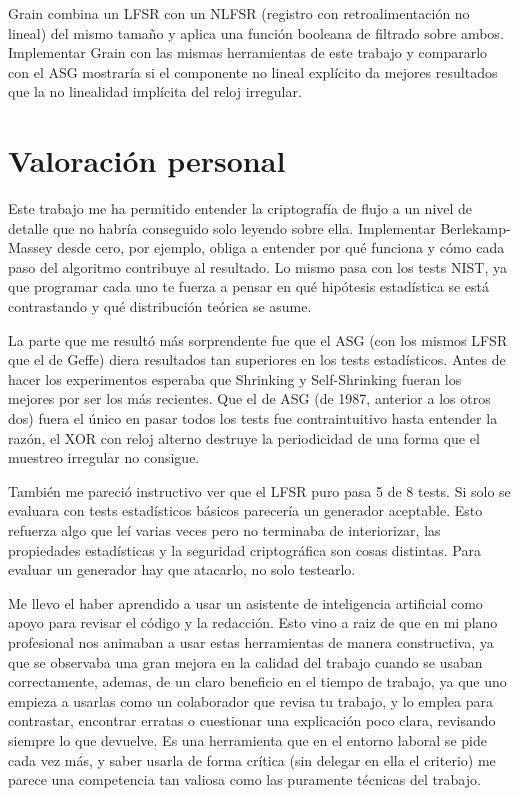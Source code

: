 Grain combina un LFSR con un NLFSR (registro con retroalimentación no lineal) del mismo tamaño y aplica una función booleana de filtrado sobre ambos.
Implementar Grain con las mismas herramientas de este trabajo y compararlo con el ASG mostraría si el componente no lineal explícito da mejores resultados
que la no linealidad implícita del reloj irregular.

\section{Valoración personal}

Este trabajo me ha permitido entender la criptografía de flujo a un nivel de detalle que no habría conseguido solo leyendo sobre ella.
Implementar Berlekamp-Massey desde cero, por ejemplo, obliga a entender por qué funciona y cómo cada paso del algoritmo contribuye al resultado.
Lo mismo pasa con los tests NIST, ya que programar cada uno te fuerza a pensar en qué hipótesis estadística se está contrastando
y qué distribución teórica se asume.

La parte que me resultó más sorprendente fue que el ASG (con los mismos LFSR que el de Geffe) diera resultados tan superiores en los tests estadísticos.
Antes de hacer los experimentos esperaba que Shrinking y Self-Shrinking fueran los mejores por ser los más recientes.
Que el de ASG (de 1987, anterior a los otros dos) fuera el único en pasar todos los tests fue contraintuitivo hasta entender la razón,
el XOR con reloj alterno destruye la periodicidad de una forma que el muestreo irregular no consigue.

También me pareció instructivo ver que el LFSR puro pasa 5 de 8 tests. Si solo se evaluara con tests estadísticos básicos parecería un generador aceptable.
Esto refuerza algo que leí varias veces pero no terminaba de interiorizar, las propiedades estadísticas y la seguridad criptográfica son cosas distintas.
Para evaluar un generador hay que atacarlo, no solo testearlo.

Me llevo el haber aprendido a usar un asistente de inteligencia artificial como apoyo para revisar el código y la redacción.
Esto vino a raiz de que en mi plano profesional nos animaban a usar estas herramientas de manera constructiva, ya que se observaba una gran mejora en la calidad del trabajo cuando se usaban correctamente,
ademas, de un claro beneficio en el tiempo de trabajo, ya que uno empieza a usarlas como un colaborador que revisa tu trabajo, y lo emplea para contrastar, encontrar erratas o cuestionar una explicación poco clara, revisando siempre lo que devuelve.
Es una herramienta que en el entorno laboral se pide cada vez más, y saber usarla de forma crítica (sin delegar en ella el criterio) me parece una competencia tan valiosa como las
puramente técnicas del trabajo.

